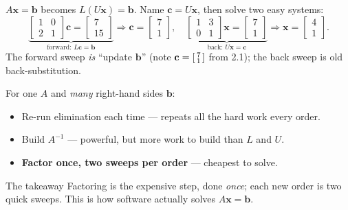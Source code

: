 \documentclass[aspectratio=169, 11pt]{beamer}
\newcommand{\xx}{\mathbf{x}}
\newcommand{\bb}{\mathbf{b}}
\newcommand{\cc}{\mathbf{c}}
\begin{document}
\begin{frame}[t, plain]
  $A\xx=\bb$ becomes $L(U\xx)=\bb$. Name $\cc=U\xx$, then solve two easy systems:
  \[
    \underbrace{\begin{bmatrix} 1&0\\2&1 \end{bmatrix}\cc = \begin{bmatrix} 7\\15 \end{bmatrix}}_{\text{forward: }L\cc=\bb}
    \Rightarrow \cc=\begin{bmatrix} 7\\1 \end{bmatrix},
    \quad
    \underbrace{\begin{bmatrix} 1&3\\0&1 \end{bmatrix}\xx = \begin{bmatrix} 7\\1 \end{bmatrix}}_{\text{back: }U\xx=\cc}
    \Rightarrow \xx=\begin{bmatrix} 4\\1 \end{bmatrix}.
  \]
  The forward sweep \emph{is} ``update $\bb$'' (note $\cc=\begin{bsmallmatrix} 7\\1 \end{bsmallmatrix}$ from 2.1); the back sweep is old back-substitution.
\end{frame}

\begin{frame}[t, plain]
  For one $A$ and \emph{many} right-hand sides $\bb$:
  \begin{itemize}
    \setlength{\itemsep}{5pt}
    \item Re-run elimination each time --- repeats all the hard work every order.
    \item Build $A^{-1}$ --- powerful, but more work to build than $L$ and $U$.
    \item \textbf{Factor once, two sweeps per order} --- cheapest to solve.
  \end{itemize}
  \begin{block}{The takeaway}
    Factoring is the expensive step, done \emph{once}; each new order is two quick sweeps. This is how software actually solves $A\xx=\bb$.
  \end{block}
\end{frame}
\end{document}
